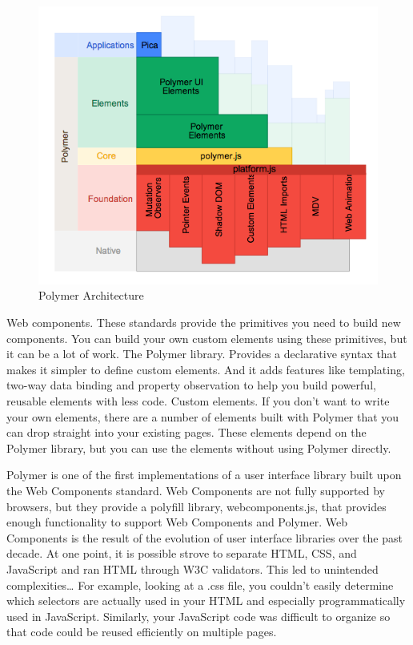 \begin {figure}[h]
\graphicspath{{images/chapter_TCH/}}
\includegraphics[width=\textwidth]{polymer_1}
\caption{Polymer Architecture}
\end {figure}
 

Web components. These standards provide the primitives you need to build new components. You can build your own custom elements using these primitives, but it can be a lot of work.
The Polymer library. Provides a declarative syntax that makes it simpler to define custom elements. And it adds features like templating, two-way data binding and property observation to help you build powerful, reusable elements with less code.
Custom elements. If you don’t want to write your own elements, there are a number of elements built with Polymer that you can drop straight into your existing pages. These elements depend on the Polymer library, but you can use the elements without using Polymer directly.\cite{tch_polymer1}


Polymer is one of the first implementations of a user interface library built upon the Web Components standard.  Web Components are not fully supported by browsers, but they provide a polyfill library, webcomponents.js, that provides enough functionality to support Web Components and Polymer.
Web Components is the result of the evolution of user interface libraries over the past decade.  At one point, it is possible strove to separate HTML, CSS, and JavaScript and ran HTML through W3C validators. This led to unintended complexities…  For example, looking at a .css file, you couldn’t easily determine which selectors are actually used in your HTML and especially programmatically used in JavaScript.  Similarly, your JavaScript code was difficult to organize so that code could be reused efficiently on multiple pages.\cite{tch_polymer2}
